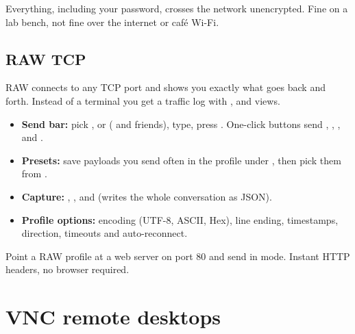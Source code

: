\begin{danger}
Everything, including your password, crosses the network unencrypted. Fine on a lab bench, not fine over the
internet or café Wi-Fi.
\end{danger}

\section{RAW TCP}

RAW connects to any TCP port and shows you exactly what goes back and forth. Instead of a terminal you get a
traffic log with ,  and  views.


\begin{itemize}
  \item \textbf{Send bar:} pick ,  or  ( and friends),
        type, press . One-click buttons send , , ,  and .
  \item \textbf{Presets:} save payloads you send often in the profile under , then pick them from
        .
  \item \textbf{Capture:} , , and  (writes the whole conversation as JSON).
  \item \textbf{Profile options:} encoding (UTF-8, ASCII, Hex), line ending, timestamps, direction, timeouts and
        auto-reconnect.
\end{itemize}

\begin{quickwin}
Point a RAW profile at a web server on port 80 and send 
in  mode. Instant HTTP headers, no browser required.
\end{quickwin}


\chapter{VNC remote desktops}\label{ch:vnc}

